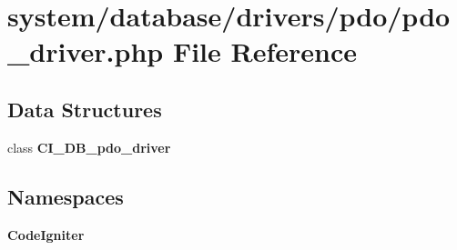 \section{system/database/drivers/pdo/pdo\-\_\-driver.php File Reference}
\label{pdo__driver_8php}
\subsection*{Data Structures}
\begin{DoxyCompactItemize}
\item 
class {\bf C\-I\-\_\-\-D\-B\-\_\-pdo\-\_\-driver}
\end{DoxyCompactItemize}
\subsection*{Namespaces}
\begin{DoxyCompactItemize}
\item 
{\bf Code\-Igniter}
\end{DoxyCompactItemize}
